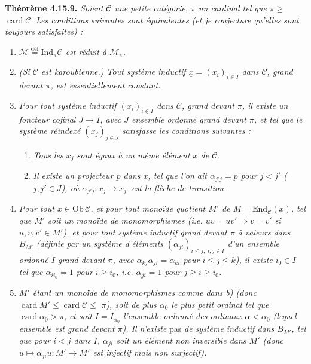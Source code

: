 \documentclass[11pt]{article}
\newcommand{\msp}[1]{\marginpar{\footnotesize [#1]}}
\newcommand{\card}{\operatorname{card}}
\begin{document}
\textbf{Théorème 4.15.9.} \textit{Soient $\mathcal{C}$ une petite catégorie, $\pi$ un cardinal tel que $\pi \geqslant$} $\card\mathcal{C}$. \textit{Les conditions suivantes sont équivalentes (et je conjecture qu'elles sont toujours satisfaites) :}
\begin{enumerate}[nosep]
\item[\textit{a)}] \textit{$\mathcal{M} \overset{\text{déf}}{=} \mathrm{Ind}_\pi\mathcal{C}$ est réduit à $\mathcal{M}_\pi$.}
\item[\textit{a$'$)}] \textit{(Si $\mathcal{C}$ est karoubienne.) Tout système inductif $\underline{x} = (x_i)_{i\in I}$ dans $\mathcal{C}$, grand devant $\pi$, est essentiellement constant.}
\item[\textit{a$''$)}] \textit{Pour tout système inductif $(x_i)_{i\in I}$ dans $\mathcal{C}$, grand devant $\pi$, il existe un foncteur cofinal $J \longrightarrow I$, avec $J$ ensemble ordonné grand devant $\pi$, et tel que le système réindexé $(x_j)_{j\in J}$ satisfasse les conditions suivantes :}
\begin{enumerate}[nosep]
\item[\textit{1)}] \textit{Tous les $x_j$ sont égaux à un même élément $x$ de $\mathcal{C}$.}
\item[\textit{2)}] \textit{Il existe un projecteur $p$ dans $x$, tel que l'on ait $\alpha_{j'j} = p$ pour $j < j'$ ($j,j' \in J$), où $\alpha_{j'j} : x_j \longrightarrow x_{j'}$ est la flèche de transition.}
\end{enumerate}
\item[\textit{b)}] \textit{Pour tout $x \in \mathrm{Ob}\,\mathcal{C}$, et pour tout monoïde quotient $M'$ de $M = \mathrm{End}_{\mathcal{C}}(x)$, tel que $M'$ soit un monoïde de monomorphismes (i.e. $uv = uv' \Longrightarrow v = v'$ si $u,v,v' \in M'$), et pour tout système inductif grand devant $\pi$ à valeurs dans $B_{M'}$ (définie par un système d'éléments $(\alpha_{ji})_{i\leqslant j,\ i,j\in I}$ d'un ensemble ordonné $I$ grand devant $\pi$, avec $\alpha_{kj}\alpha_{ji} = \alpha_{ki}$ pour $i \leqslant j \leqslant k$), il existe $i_0 \in I$ tel}
\msp{page 462}
\textit{que $\alpha_{ii_0} = 1$ pour $i \geqslant i_0$, i.e. $\alpha_{ji} = 1$ pour $j \geqslant i \geqslant i_0$.}
\item[\textit{b$'$)}] \textit{$M'$ étant un monoïde de monomorphismes comme dans b) (donc} $\card M' \leqslant \card\mathcal{C} \leqslant$ \textit{$\pi$), soit de plus $\alpha_0$ le plus petit ordinal tel que} $\card\alpha_0 > \pi$, \textit{et soit $I = I_{\alpha_0}$ l'ensemble ordonné des ordinaux $\alpha < \alpha_0$ (lequel ensemble est grand devant $\pi$). Il n'existe} pas \textit{de système inductif dans $B_{M'}$, tel que pour $i < j$ dans $I$, $\alpha_{ji}$ soit un élément non inversible dans $M'$ (donc $u \longmapsto \alpha_{ji}u : M' \longrightarrow M'$ est injectif mais non surjectif).}
\end{enumerate}
\end{document}
